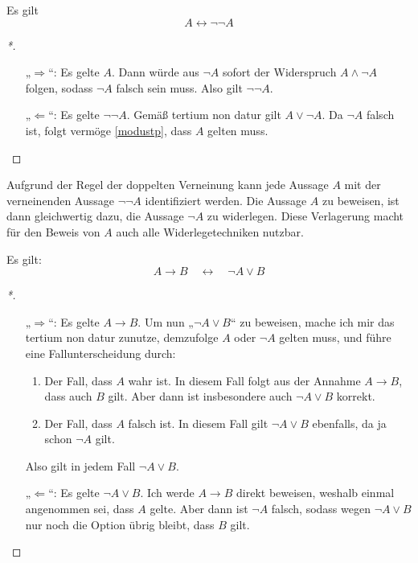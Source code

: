    
\begin{satz} \label{doppelneg}
    Es gilt
    \[ A\leftrightarrow \neg \neg A \]
\end{satz}
\begin{proof}[*]
    \begin{itemize}
        \item[„$\Rightarrow$“:] Es gelte $A$. Dann würde aus $\neg A$ sofort der Widerspruch $A\land \neg A$ folgen, sodass $\neg A$ falsch sein muss. Also gilt $\neg\neg A$.
        \item[„$\Leftarrow$“:] Es gelte $\neg \neg A$. Gemäß tertium non datur gilt $A\lor \neg A$. Da $\neg A$ falsch ist, folgt vermöge \cref{modustp}, dass $A$ gelten muss. \qedhere
    \end{itemize}
\end{proof}


\begin{bem}
    Aufgrund der Regel der doppelten Verneinung kann jede Aussage $A$ mit der verneinenden Aussage $\neg\neg A$ identifiziert werden. Die Aussage $A$ zu beweisen, ist dann gleichwertig dazu, die Aussage $\neg A$ zu widerlegen. Diese Verlagerung macht für den Beweis von $A$ auch alle Widerlegetechniken nutzbar.
\end{bem}


\begin{satz} \label{implikationchar}
    Es gilt:
        \[ A\to B\quad \leftrightarrow\quad \neg A\lor B \]
\end{satz}
\begin{proof}[*]
    \begin{enumerate}
        \item[„$\Rightarrow$“:] Es gelte $A\to B$. Um nun „$\neg A\lor B$“ zu beweisen, mache ich mir das tertium non datur zunutze, demzufolge $A$ oder $\neg A$ gelten muss, und führe eine Fallunterscheidung durch:
        \begin{enumerate}[1)]
            \item Der Fall, dass $A$ wahr ist. In diesem Fall folgt aus der Annahme $A\to B$, dass auch $B$ gilt. Aber dann ist insbesondere auch $\neg A\lor B$ korrekt.
            \item Der Fall, dass $A$ falsch ist. In diesem Fall gilt $\neg A\lor B$ ebenfalls, da ja schon $\neg A$ gilt.
        \end{enumerate}
        Also gilt in jedem Fall $\neg A\lor B$.
        \item[„$\Leftarrow$“:] Es gelte $\neg A\lor B$. Ich werde $A\to B$ direkt beweisen, weshalb einmal angenommen sei, dass $A$ gelte. Aber dann ist $\neg A$ falsch, sodass wegen $\neg A\lor B$ nur noch die Option übrig bleibt, dass $B$ gilt. \qedhere
    \end{enumerate}
\end{proof}


